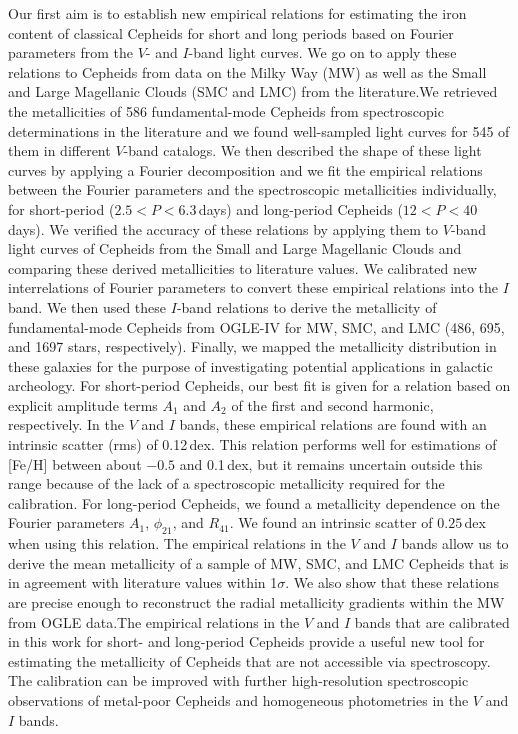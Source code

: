 \documentclass[article]{aa} %
\begin{document}
{Our first aim is to establish new empirical relations for estimating the iron content of classical Cepheids for short and long periods based on Fourier parameters from the $V$- and $I$-band light curves. We go on to apply these relations to Cepheids from data on the Milky Way (MW) as well as the Small and Large Magellanic Clouds (SMC and LMC) from the literature.}{We retrieved the metallicities of 586 fundamental-mode Cepheids from spectroscopic determinations in the literature and we found well-sampled light curves for 545 of them in different $V$-band catalogs. We then described the shape of these light curves by applying a Fourier decomposition and we fit the empirical relations between the Fourier parameters and the spectroscopic metallicities individually, for short-period ($2.5<P<6.3\,$days) and long-period Cepheids ($12<P<40\,$days). We verified the accuracy of these relations by applying them to $V$-band light curves of Cepheids from the Small and Large Magellanic Clouds and comparing these derived metallicities to literature values. We calibrated new interrelations of Fourier parameters to convert these empirical relations into the $I$ band. We then used these $I$-band relations to derive the metallicity of fundamental-mode Cepheids from OGLE-IV for MW, SMC, and LMC (486, 695, and 1697 stars, respectively). Finally, we mapped the metallicity distribution in these galaxies for the purpose of investigating potential applications in galactic archeology.} {For short-period Cepheids, our best fit is given for a relation based on explicit amplitude terms $A_1$ and $A_2$ of the first and second harmonic, respectively. In the $V$ and $I$ bands, these empirical relations are found with an intrinsic scatter (rms) of 0.12$\,$dex. This relation performs well for estimations of [Fe/H] between about $-0.5$ and 0.1$\,$dex, but it remains uncertain outside this range because of the lack of a spectroscopic metallicity required for the calibration. For long-period Cepheids, we found a metallicity dependence on the Fourier parameters $A_1$, $\phi_{21}$, and $R_{41}$. We found an intrinsic scatter of $0.25\,$dex when using this relation. The empirical relations in the $V$ and $I$ bands allow us to  derive the mean metallicity of a sample of MW, SMC, and LMC Cepheids that is in agreement with literature values within 1$\sigma$. We also show that these relations are precise enough to reconstruct the radial metallicity gradients within the MW from  OGLE data.}{The empirical relations in the $V$ and $I$ bands that are calibrated in this work for short- and long-period Cepheids provide a  useful new tool for estimating the metallicity of Cepheids that are not accessible via spectroscopy. The calibration can be improved with further high-resolution spectroscopic observations of metal-poor Cepheids and homogeneous photometries in the $V$ and $I$ bands.}
{}
\end{document}
